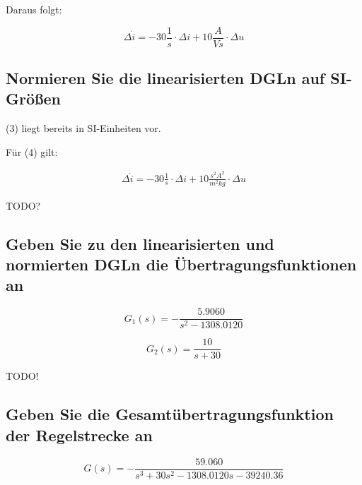 \documentclass[a4paper,10pt,left=1.5cm,right=1.5cm,top=1.5cm,bottom=1.5cm]{article}
\begin{document}
Daraus folgt:

\begin{equation}
  \Delta \dot{i} = -30 \frac{1}{s} \cdot \Delta i + 10 \frac{A}{Vs} \cdot \Delta u
\end{equation}

\subsection{Normieren Sie die linearisierten DGLn auf SI-Größen}

(3) liegt bereits in SI-Einheiten vor.

Für (4) gilt:

\begin{eqnarray}
  \Delta \dot{i} = -30 \frac{1}{s} \cdot \Delta i + 10 \frac{s^2 A^2}{m^2 kg} \cdot \Delta u
\end{eqnarray}

TODO?

\subsection{Geben Sie zu den linearisierten und normierten DGLn die Übertragungsfunktionen an}

\begin{equation}
  G_1(s) = - \frac{5.9060}{s^2 - 1308.0120}
\end{equation}

\begin{equation}
  G_2(s) = \frac{10}{s+30}
\end{equation}

TODO!

\subsection{Geben Sie die Gesamtübertragungsfunktion der Regelstrecke an}

\begin{equation}
  G(s) = - \frac{59.060}{s^3 + 30 s^2 - 1308.0120 s - 39240.36}
\end{equation}
\end{document}
